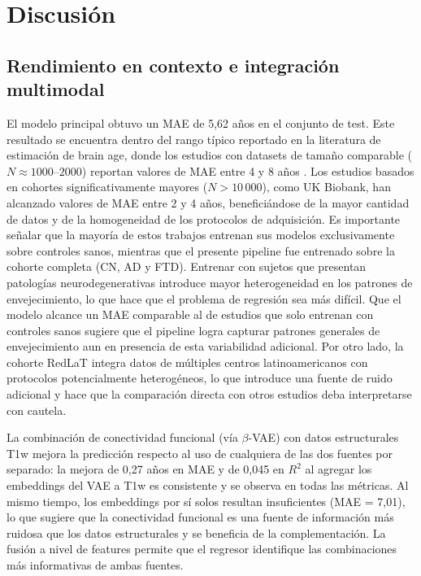 \section{Discusión}
\label{sec:discusion}

\subsection{Rendimiento en contexto e integración multimodal}

El modelo principal obtuvo un MAE de 5,62 años en el conjunto de test. Este resultado se encuentra dentro del rango típico reportado en la literatura de estimación de brain age, donde los estudios con datasets de tamaño comparable ($N \approx 1000\text{--}2000$) reportan valores de MAE entre 4 y 8 años \cite{franke2010estimating}. Los estudios basados en cohortes significativamente mayores ($N > 10\,000$), como UK Biobank, han alcanzado valores de MAE entre 2 y 4 años, beneficiándose de la mayor cantidad de datos y de la homogeneidad de los protocolos de adquisición. Es importante señalar que la mayoría de estos trabajos entrenan sus modelos exclusivamente sobre controles sanos, mientras que el presente pipeline fue entrenado sobre la cohorte completa (CN, AD y FTD). Entrenar con sujetos que presentan patologías neurodegenerativas introduce mayor heterogeneidad en los patrones de envejecimiento, lo que hace que el problema de regresión sea más difícil. Que el modelo alcance un MAE comparable al de estudios que solo entrenan con controles sanos sugiere que el pipeline logra capturar patrones generales de envejecimiento aun en presencia de esta variabilidad adicional. Por otro lado, la cohorte RedLaT integra datos de múltiples centros latinoamericanos con protocolos potencialmente heterogéneos, lo que introduce una fuente de ruido adicional y hace que la comparación directa con otros estudios deba interpretarse con cautela.

La combinación de conectividad funcional (vía $\beta$-VAE) con datos estructurales T1w mejora la predicción respecto al uso de cualquiera de las dos fuentes por separado: la mejora de 0,27 años en MAE y de 0,045 en $R^2$ al agregar los embeddings del VAE a T1w es consistente y se observa en todas las métricas. Al mismo tiempo, los embeddings por sí solos resultan insuficientes (MAE = 7,01), lo que sugiere que la conectividad funcional es una fuente de información más ruidosa que los datos estructurales y se beneficia de la complementación. La fusión a nivel de features permite que el regresor identifique las combinaciones más informativas de ambas fuentes.

